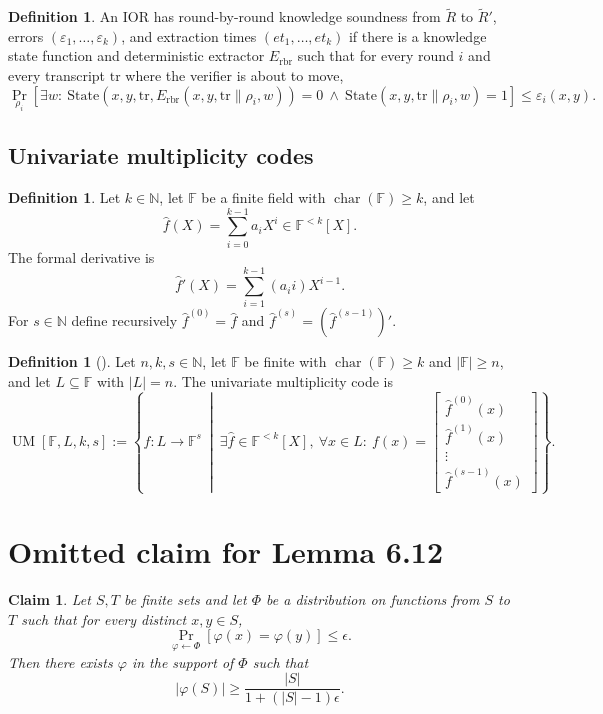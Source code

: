 \documentclass[11pt]{article}
\theoremstyle{plain}
\newtheorem{claim}[theorem]{Claim}
\theoremstyle{definition}
\newtheorem{definition}[theorem]{Definition}
\newcommand{\F}{\mathbb{F}}
\newcommand{\N}{\mathbb{N}}
\newcommand{\UM}[4]{\operatorname{UM}[#1,#2,#3,#4]}
\newcommand{\abs}[1]{\left|#1\right|}
\DeclareMathOperator{\charop}{char}
\DeclareMathOperator*{\Prb}{Pr}
\begin{document}
\begin{definition}
An IOR has round-by-round knowledge soundness from $\widetilde R$ to $\widetilde R'$, errors $(\varepsilon_1,\ldots,\varepsilon_k)$, and extraction times $(et_1,\ldots,et_k)$ if there is a knowledge state function and deterministic extractor $E_{\mathrm{rbr}}$ such that for every round $i$ and every transcript $\mathrm{tr}$ where the verifier is about to move,
\[
\Prb_{\rho_i}\left[
\exists w:\
\mathrm{State}(x,y,\mathrm{tr},E_{\mathrm{rbr}}(x,y,\mathrm{tr}\|\rho_i,w))=0
\ \wedge\
\mathrm{State}(x,y,\mathrm{tr}\|\rho_i,w)=1
\right]
\le \varepsilon_i(x,y).
\]
\end{definition}

\subsection{Univariate multiplicity codes}

\begin{definition}
Let $k\in\N$, let $\F$ be a finite field with $\charop(\F)\ge k$, and let
\[
  \hat f(X)=\sum_{i=0}^{k-1}a_iX^i\in\F^{<k}[X].
\]
The formal derivative is
\[
  \hat f'(X)=\sum_{i=1}^{k-1}(a_i i)X^{i-1}.
\]
For $s\in\N$ define recursively $\hat f^{(0)}=\hat f$ and $\hat f^{(s)}=(\hat f^{(s-1)})'$.
\end{definition}

\begin{definition}[\cite{GW13,KSY14}]
Let $n,k,s\in\N$, let $\F$ be finite with $\charop(\F)\ge k$ and $\abs{\F}\ge n$, and let $L\subseteq\F$ with $\abs{L}=n$. The univariate multiplicity code is
\[
\UM{\F}{L}{k}{s}:=
\left\{ f:L\to\F^s\ \middle|\
\exists \hat f\in\F^{<k}[X],\ \forall x\in L:\
f(x)=\begin{bmatrix}
\hat f^{(0)}(x)\\
\hat f^{(1)}(x)\\
\vdots\\
\hat f^{(s-1)}(x)
\end{bmatrix}
\right\}.
\]
\end{definition}

\section{Omitted claim for Lemma 6.12}

\begin{claim}
Let $S,T$ be finite sets and let $\Phi$ be a distribution on functions from $S$ to $T$ such that for every distinct $x,y\in S$,
\[
  \Prb_{\varphi\leftarrow\Phi}[\varphi(x)=\varphi(y)]\le\epsilon.
\]
Then there exists $\varphi$ in the support of $\Phi$ such that
\[
  \abs{\varphi(S)}\ge \frac{\abs{S}}{1+(\abs{S}-1)\epsilon}.
\]
\end{claim}
\end{document}
